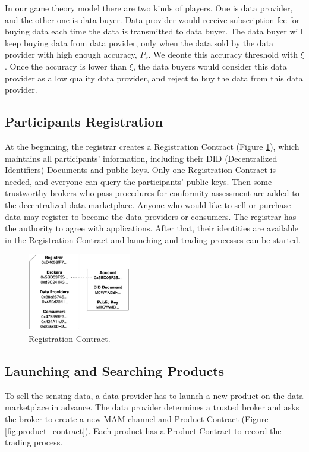 \documentclass[journal,a4paper]{IEEEtran}
\begin{document}
In our game theory model there are two kinds of players. One is data provider, and the other one is data buyer. Data provider would receive subscription fee for buying data each time the data is transmitted to data buyer.
The data buyer will keep buying data from data povider, only when the data sold by the data provider with high enough accuracy, $P_r$. We deonte this accuracy threshold with $\xi$.
Once the accuracy is lower than $\xi$, the data buyers would consider this data provider as a low quality data provider, and reject to buy the data from this data provider.



\subsection{Participants Registration}
At the beginning, the registrar creates a Registration Contract (Figure \ref{fig:registration_contract}), which maintains all participants' information, including their DID (Decentralized Identifiers) Documents and public keys. Only one Registration Contract is needed, and everyone can query the participants' public keys. Then some trustworthy brokers who pass procedures for conformity assessment are added to the decentralized data marketplace. Anyone who would like to sell or purchase data may register to become the data providers or consumers. The registrar has the authority to agree with applications. After that, their identities are available in the Registration Contract and launching and trading processes can be started.

\begin{figure}[h]
	\centering
	\includegraphics[width=0.4\textwidth]{registration_contract}
	\caption{Registration Contract.}
	\label{fig:registration_contract}
\end{figure}

\subsection{Launching and Searching Products}
To sell the sensing data, a data provider has to launch a new product on the data marketplace in advance. The data provider determines a trusted broker and asks the broker to create a new MAM channel and Product Contract (Figure \ref{fig:product_contract}). Each product has a Product Contract to record the trading process.
\end{document}
